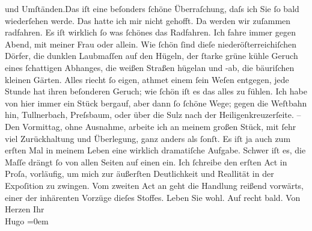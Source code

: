 \begin{ledgroupsized}[t]{13cm}
               und Umſtänden.\hspace*{1.5em}Das iſt {\pb}eine beſonders ſchöne
               Überraſchung, daſs ich Sie ſo bald wiederſehen werde. Das hatte ich mir nicht
               gehofft.\pend
           \pstart
           Da werden wir zuſammen radfahren. Es iſt wirklich ſo was ſchönes das Radfahren. Ich
               fahre immer gegen Abend, mit meiner Frau oder allein. Wie ſchön ſind dieſe niederöſterreichiſchen Dörfer, die dunklen Laubmaſſen auf den
               Hügeln, der ſtarke grüne kühle Geruch eines ſchattigen Abhanges, die weißen Straßen
               hügelan und -ab, die bäuriſchen kleinen Gärten. Alles riecht ſo eigen, athmet einem
               ſein {\pb}Weſen entgegen, jede Stunde
               hat ihren beſonderen Geruch; wie ſchön iſt es das alles zu fühlen.\pend
           \pstart
           Ich habe von hier immer ein Stück bergauf, aber dann ſo ſchöne Wege; gegen die Weſtbahn hin, Tullnerbach, Preſsbaum, oder über die
                  Sulz nach der Heiligenkreuzerſeite.\pend
           \pstart
           \numberlinefalse{}–\numberlinetrue{}\pend
           \pstart
           Den Vormittag, ohne Ausnahme, arbeite ich an meinem großen Stück, mit ſehr viel Zurückhaltung und
               Überlegung, ganz anders als ſonſt. Es iſt {\pb}ja auch zum erſten Mal in meinem
               Leben eine wirklich dramatiſche Aufgabe. Schwer iſt es, die Maſſe drängt ſo von allen
               Seiten auf einen ein. Ich ſchreibe den erſten Act in Proſa, vorläufig, um mich zur
               äußerſten Deutlichkeit und Reallität in der Expoſition zu zwingen.\pend
           \pstart
           Vom zweiten Act an geht die Handlung reißend vorwärts, einer der inhärenten Vorzüge
               dieſes Stoffes.\pend
           \pstart
           Leben Sie wohl. Auf recht bald.\pend
           \pstart
           Von Herzen Ihr{\\[\baselineskip]}\spacefill\mbox{Hugo}\pend
           \leftskip=0em{}
         
         \endnumbering{}\end{ledgroupsized}  \newcommand{\dateiname}{L01161}\newcommand{\titel}{Hugo von Hofmannsthal an Arthur Schnitzler, 12. 8. [1901]}\newcommand{\editorInnen}{Martin Anton Müller und Gerd-Hermann Susen}
      
